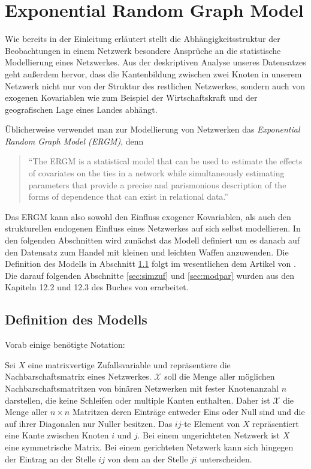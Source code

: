 \documentclass[a4paper,ngerman,oneside,titlepage,bibliography=totoc,11pt]{scrreprt}
\begin{document}
\chapter{Exponential Random Graph Model}
 Wie bereits in der Einleitung erläutert stellt die Abhängigkeitsstruktur der Beobachtungen in einem Netzwerk besondere Ansprüche an die statistische Modellierung eines Netzwerkes. Aus der deskriptiven Analyse unseres Datensatzes geht außerdem hervor, dass die Kantenbildung zwischen zwei Knoten in unserem Netzwerk nicht nur von der Struktur des restlichen Netzwerkes, sondern auch von exogenen Kovariablen wie zum Beispiel der Wirtschaftskraft und der geografischen Lage eines Landes abhängt.

Üblicherweise verwendet man zur Modellierung von Netzwerken das \emph{Exponential Random Graph Model (ERGM)}, denn
\begin{quote}
"`The ERGM is a statistical model that can be used to estimate the effects of covariates on the ties in a network while simultaneously estimating parameters that provide a precise and parismonious description of the forms of dependence that can exist in relational data."' \citep{cranmer2011inferential}
\end{quote}
Das ERGM kann also sowohl den Einfluss exogener Kovariablen, als auch den strukturellen endogenen Einfluss eines Netzwerkes auf sich selbst modellieren. In den folgenden Abschnitten wird zunächst das Modell definiert um es danach auf den Datensatz zum Handel mit kleinen und leichten Waffen anzuwenden. Die Definition des Modells in Abschnitt \ref{sec:defmod} folgt im wesentlichen dem Artikel von \citet{hunter2008ergm}. Die darauf folgenden Abschnitte \ref{sec:simzuf} und \ref{sec:modpar} wurden aus den Kapiteln 12.2 und 12.3 des Buches von \citet{lkr12} erarbeitet.

\section{Definition des Modells}
\label{sec:defmod}
Vorab einige benötigte Notation:

Sei $X$ eine matrixvertige Zufallsvariable und repräsentiere die Nachbarschaftsmatrix eines Netzwerkes. $\mathcal{X}$ soll die Menge aller möglichen Nachbarschaftsmatritzen von binären Netzwerken mit fester Knotenanzahl $n$ darstellen, die keine Schleifen oder multiple Kanten enthalten. Daher ist $\mathcal{X}$ die Menge aller $n \times n$ Matritzen deren Einträge entweder Eins oder Null sind und die auf ihrer Diagonalen nur Nuller besitzen. Das $ij$-te Element von $X$ repräsentiert eine Kante zwischen Knoten $i$ und $j$. Bei einem ungerichteten Netzwerk ist $X$ eine symmetrische Matrix. Bei einem gerichteten Netzwerk kann sich hingegen der Eintrag an der Stelle $ij$ von dem an der Stelle $ji$ unterscheiden.
\end{document}
